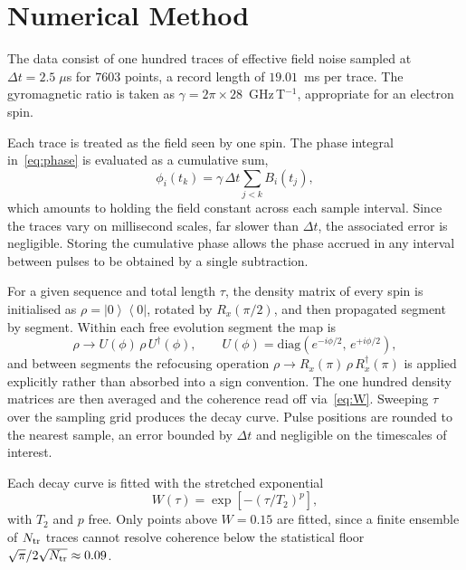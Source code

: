 \documentclass[conference]{IEEEtran}
\newcommand{\ket}[1]{\left|#1\right\rangle}
\newcommand{\bra}[1]{\left\langle#1\right|}
\begin{document}
\section{Numerical Method}\label{sec:methods}

The data consist of one hundred traces of effective field noise sampled at
$\Delta t = 2.5\;\mu$s for $7603$ points, a record length of $19.01$~ms per trace.
The gyromagnetic ratio is taken as $\gamma = 2\pi \times 28$~GHz\,T$^{-1}$,
appropriate for an electron spin.

Each trace is treated as the field seen by one spin. The phase integral
in~\eqref{eq:phase} is evaluated as a cumulative sum,
\begin{equation}
\phi_i(t_k) = \gamma\,\Delta t \sum_{j<k} B_i(t_j) ,
\end{equation}
which amounts to holding the field constant across each sample interval. Since the
traces vary on millisecond scales, far slower than $\Delta t$, the associated error
is negligible. Storing the cumulative phase allows the phase accrued in any
interval between pulses to be obtained by a single subtraction.

For a given sequence and total length $\tau$, the density matrix of every spin is
initialised as $\rho = \ket{0}\bra{0}$, rotated by $R_x(\pi/2)$, and then
propagated segment by segment. Within each free evolution segment the map is
\begin{equation}
\rho \rightarrow U(\phi)\,\rho\,U^{\dagger}(\phi), \qquad
U(\phi) = \mathrm{diag}\!\left(e^{-i\phi/2},\,e^{+i\phi/2}\right),
\end{equation}
and between segments the refocusing operation $\rho \rightarrow R_x(\pi)\,\rho\,
R_x^{\dagger}(\pi)$ is applied explicitly rather than absorbed into a sign
convention. The one hundred density matrices are then averaged and the coherence
read off via~\eqref{eq:W}. Sweeping $\tau$ over the sampling grid produces the
decay curve. Pulse positions are rounded to the nearest sample, an error bounded by
$\Delta t$ and negligible on the timescales of interest.

Each decay curve is fitted with the stretched exponential
\begin{equation}
W(\tau) = \exp\left[-\left(\tau/T_2\right)^{p}\right] ,
\label{eq:fitfun}
\end{equation}
with $T_2$ and $p$ free. Only points above $W = 0.15$ are fitted, since a finite
ensemble of $N_{\rm tr}$ traces cannot resolve coherence below the statistical
floor $\sqrt{\pi}/2\sqrt{N_{\rm tr}} \approx 0.09$.
\end{document}
